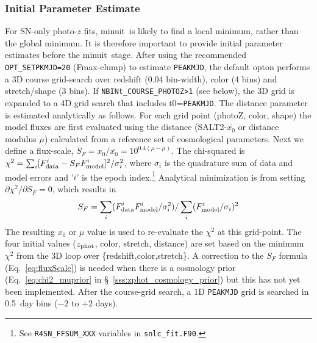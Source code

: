 \documentclass[12pt]{article}
\newcommand{\Zphot}{z_{\rm phot}}
\newcommand{\minuit}{{\sc minuit}}
\begin{document}
   \clearpage
   \subsubsection{Initial Parameter Estimate}
   \label{sss:photoz_ini}

\newcommand{\dSCALE}{d_{\rm scale}}
\newcommand{\Fdata}{F_{\rm data}^i}
\newcommand{\Fmodel}{F_{\rm model}^i}
\newcommand{\fluxScale}{S_{F}}


For SN-only photo-$z$ fits, \minuit\ is likely to find a
local minimum, rather than the global minimum. It is therefore
important to provide initial parameter estimates before the
\minuit\ stage. 
After using the recommended {\tt OPT\_SETPKMJD=20} (Fmax-clump)
to estimate {\tt PEAKMJD},
the default opton performs a 3D course grid-search over 
redshift (0.04 bin-width), color (4 bins) and stretch/shape (3 bins).
If {\tt NBINt\_COURSE\_PHOTOZ>1} (see below), 
the 3D grid is expanded to a 4D grid search that includes t0={\tt PEAKMJD}.
The distance parameter is estimated analytically as follows.
For each grid point (photoZ, color, shape) the model fluxes
are first evaluated using the distance
(SALT2-$\bar{x_0}$ or distance modulus $\bar\mu$) 
calculated from a reference set of cosmological parameters. 
Next we define a flux-scale,
  $\fluxScale = x_0/\bar{x_0} = 10^{0.4(\mu-\bar{\mu})}$.
%
The chi-squared is
 $\chi^2 = \sum_i [\Fdata - \fluxScale\Fmodel]^2/\sigma_i^2$,
where $\sigma_i$ is the quadrature sum of data and model errors
and '$i$' is the epoch index.\footnote{See {\tt R4SN\_FFSUM\_XXX}
   variables in {\tt snlc\_fit.F90}.}
Analytical minimization is from setting $\partial \chi^2/\partial\fluxScale = 0$, 
which results in
%
\begin{equation}
  \fluxScale
    = \sum_i( \Fdata\Fmodel/\sigma_i^2) / \sum_i(\Fmodel/\sigma_i)^2
    \label{eq:fluxScale}
\end{equation}
%
The resulting $x_0$ or $\mu$ value is used to re-evaluate
the $\chi^2$ at this grid-point. 
The four initial values ($\Zphot$, color, stretch, distance)
are set based on the minimum $\chi^2$ from the 3D loop over \{redshift,color,stretch\}. 
A correction to the $\fluxScale$ formula (Eq.~\ref{eq:fluxScale})
is needed when there is a cosmology prior
(Eq.~\ref{eq:chi2_muprior} in \S~\ref{sss:zphot_cosmology_prior})
but this has not yet been implemented.
After the course-grid search, a 1D {\tt PEAKMJD} grid is searched in 0.5~day bins ($-2$ to $+2$ days).
\end{document}
